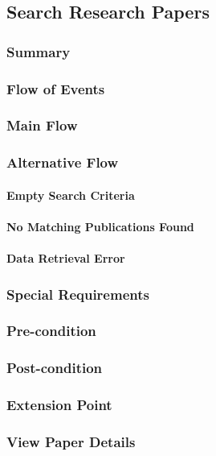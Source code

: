 \subsection{Search Research Papers}
\subsubsection{Summary}

\subsubsection{Flow of Events}
\subsubsection*{Main Flow}

\subsubsection*{Alternative Flow}
\paragraph{Empty Search Criteria}

\paragraph{No Matching Publications Found}

\paragraph{Data Retrieval Error}

\subsubsection{Special Requirements}

\subsubsection{Pre-condition}

\subsubsection{Post-condition}

\subsubsection{Extension Point}

\subsubsection*{View Paper Details}